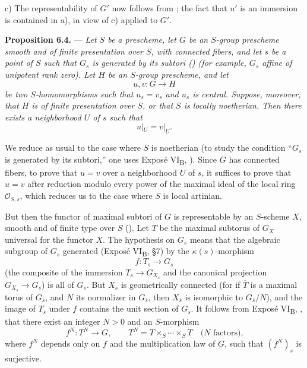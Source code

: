 \medskip
\noindent c) The representability of \(G'\) now follows from ;
the fact that \(u'\) is an immersion is contained in  a), in
view of  c) applied to \(G'\).

\medskip
\noindent{}%
\textbf{Proposition 6.4.} --- \textit{Let \(S\) be a prescheme,
let \(G\) be an \(S\)-group prescheme smooth and of finite
presentation over \(S\), with connected fibers, and let \(s\) be
a point of \(S\) such that \(G_s\) is generated by its subtori
() (for example, \(G_s\) affine of unipotent rank
zero). Let \(H\) be an \(S\)-group prescheme, and let}
\[
  u,v:G\longrightarrow H
\]
\textit{be two \(S\)-homomorphisms such that \(u_s=v_s\) and
\(u_s\) is central. Suppose, moreover, that \(H\) is of finite
presentation over \(S\), or that \(S\) is locally noetherian.
Then there exists a neighborhood \(U\) of \(s\) such that}
\[
  u|_U=v|_U.
\]

\medskip
We reduce as usual to the case where \(S\) is noetherian (to study
the condition ``\(G_s\) is generated by its subtori,'' one uses
Exposé VI\textsubscript{B}, ). Since \(G\) has connected fibers,
to prove that \(u=v\) over a neighborhood \(U\) of \(s\), it
suffices to prove that \(u=v\) after reduction modulo every power
of the maximal ideal of the local ring \(\mathcal O_{S,s}\), which
reduces us to the case where \(S\) is local artinian.

But then the functor of maximal subtori of \(G\) is representable
by an \(S\)-scheme \(X\), smooth and of finite type over \(S\)
(). Let \(T\) be the maximal subtorus of \(G_X\)
universal for the functor \(X\). The hypothesis on \(G_s\) means
that the algebraic subgroup of \(G_s\) generated (Exposé
VI\textsubscript{B}, \S7) by the \(\kappa(s)\)-morphism
\[
  f:T_s\longrightarrow G_s
\]
(the composite of the immersion \(T_s\to G_{X_s}\) and the
canonical projection \(G_{X_s}\to G_s\)) is all of \(G_s\). But
\(X_s\) is geometrically connected (for if \(\overline T\) is a
maximal torus of \(G_{\bar s}\), and \(N\) its normalizer in
\(G_{\bar s}\), then \(X_{\bar s}\) is isomorphic to
\(G_{\bar s}/N\)), and the image of \(T_s\) under \(f\) contains
the unit section of \(G_s\). It follows from Exposé
VI\textsubscript{B}, , that there exist an integer \(N>0\) and
an \(S\)-morphism
\[
  f^N:T^N\longrightarrow G,
  \qquad
  T^N=T\times_S\cdots\times_S T
  \quad\text{(\(N\) factors),}
\]
where \(f^N\) depends only on \(f\) and the multiplication law of
\(G\), such that \((f^N)_s\) is surjective.

